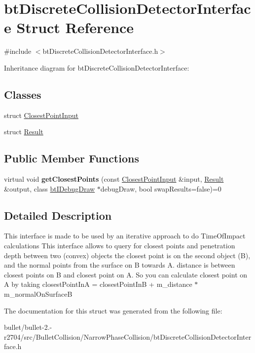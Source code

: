 \hypertarget{structbt_discrete_collision_detector_interface}{\section{bt\+Discrete\+Collision\+Detector\+Interface Struct Reference}
\label{structbt_discrete_collision_detector_interface}
}


{\ttfamily \#include $<$bt\+Discrete\+Collision\+Detector\+Interface.\+h$>$}



Inheritance diagram for bt\+Discrete\+Collision\+Detector\+Interface\+:
\subsection*{Classes}
\begin{DoxyCompactItemize}
\item 
struct \hyperlink{structbt_discrete_collision_detector_interface_1_1_closest_point_input}{Closest\+Point\+Input}
\item 
struct \hyperlink{structbt_discrete_collision_detector_interface_1_1_result}{Result}
\end{DoxyCompactItemize}
\subsection*{Public Member Functions}
\begin{DoxyCompactItemize}
\item 
\hypertarget{structbt_discrete_collision_detector_interface_af749c5b0731c32d086a0a42e17c38b73}{virtual void {\bfseries get\+Closest\+Points} (const \hyperlink{structbt_discrete_collision_detector_interface_1_1_closest_point_input}{Closest\+Point\+Input} \&input, \hyperlink{structbt_discrete_collision_detector_interface_1_1_result}{Result} \&output, class \hyperlink{classbt_i_debug_draw}{bt\+I\+Debug\+Draw} $\ast$debug\+Draw, bool swap\+Results=false)=0}\label{structbt_discrete_collision_detector_interface_af749c5b0731c32d086a0a42e17c38b73}

\end{DoxyCompactItemize}


\subsection{Detailed Description}
This interface is made to be used by an iterative approach to do Time\+Of\+Impact calculations This interface allows to query for closest points and penetration depth between two (convex) objects the closest point is on the second object (B), and the normal points from the surface on B towards A. distance is between closest points on B and closest point on A. So you can calculate closest point on A by taking closest\+Point\+In\+A = closest\+Point\+In\+B + m\+\_\+distance $\ast$ m\+\_\+normal\+On\+Surface\+B 

The documentation for this struct was generated from the following file\+:\begin{DoxyCompactItemize}
\item 
bullet/bullet-\/2.-\/r2704/src/\+Bullet\+Collision/\+Narrow\+Phase\+Collision/bt\+Discrete\+Collision\+Detector\+Interface.\+h\end{DoxyCompactItemize}
